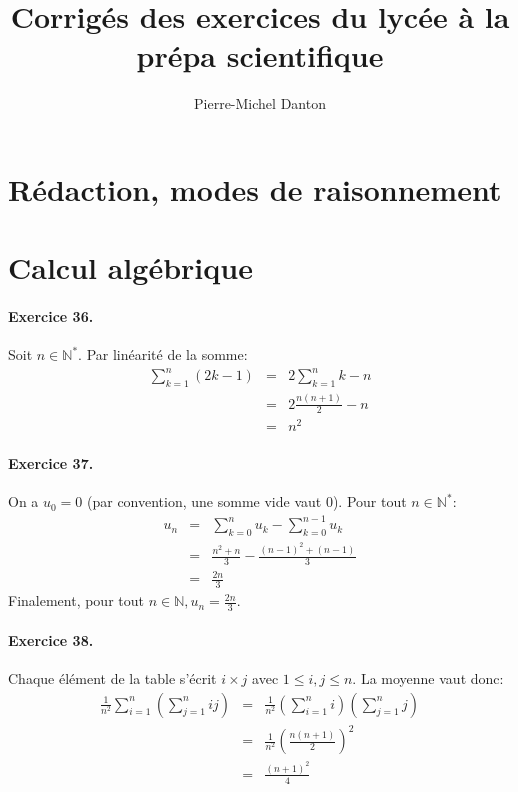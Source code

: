 \documentclass[a4paper,11pt]{article}
\title{Corrigés des exercices du lycée à la prépa scientifique}
\author{Pierre-Michel Danton}
\begin{document}
\maketitle
\tableofcontents
\newpage

\section{Rédaction, modes de raisonnement}
\section{Calcul algébrique}

\paragraph{Exercice 36.} Soit $n\in\mathbb{N^*}$. Par linéarité de la somme:
\begin{eqnarray}
  \sum_{k=1}^n{(2k-1)} &=& 2\sum_{k=1}^n{k}-n \nonumber \\ 
                      &=& 2\frac{n(n+1)}{2}-n \nonumber \\ 
                      &=& n^2 \nonumber
\end{eqnarray}

\paragraph{Exercice 37.} On a $u_0=0$ (par convention, une somme vide vaut 0). Pour tout $n\in\mathbb{N}^*$:
\begin{eqnarray}
  u_n &=& \sum_{k=0}^n{u_k} - \sum_{k=0}^{n-1}{u_k} \nonumber \\ 
                      &=& \frac{n^2 + n}{3}- \frac{(n-1)^2 + (n-1)}{3}\nonumber \\ 
                      &=& \frac{2n}{3} \nonumber
\end{eqnarray}
Finalement, pour tout $n\in\mathbb{N}, u_n=\frac{2n}{3}$.

\paragraph{Exercice 38.} Chaque élément de la table s’écrit $i\times j$ avec $1\leq i,j\leq n$. La moyenne vaut donc:
\begin{eqnarray}
\frac{1}{n^2}\sum_{i=1}^n{\left(\sum_{j=1}^n{ij}\right)} &=& \frac{1}{n^2}\left(\sum_{i=1}^n{i}\right)\left(\sum_{j=1}^n{j}\right) \nonumber \\
&=& \frac{1}{n^2}\left(\frac{n(n+1)}{2}\right)^2 \nonumber \\
&=& \frac{(n+1)^2}{4} \nonumber 
\end{eqnarray}
\end{document}
